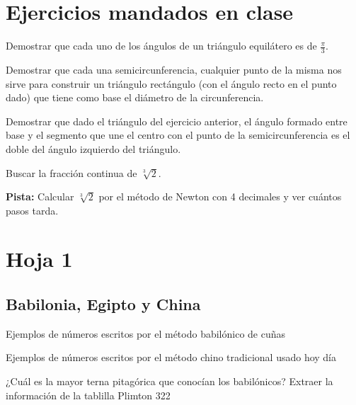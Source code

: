 \section{Ejercicios mandados en clase}
\begin{problem}[1]
Demostrar que cada uno de los ángulos de un triángulo equilátero es de $\frac{π}{3}$.
\solution
\end{problem}

\begin{problem}[2]
Demostrar que cada una semicircunferencia, cualquier punto de la misma nos sirve para construir un triángulo rectángulo (con el ángulo recto en el punto dado) que tiene como base el diámetro de la circunferencia.
\solution
\end{problem}

\begin{problem}[3]
Demostrar que dado el triángulo del ejercicio anterior, el ángulo formado entre base y el segmento que une el centro con el punto de la semicircunferencia es el doble del ángulo izquierdo del triángulo.
\solution
\end{problem}

\begin{problem}[4]
Buscar la fracción continua de $\sqrt[3]{2}$.

\textbf{Pista:} Calcular $\sqrt[3]{2}$ por el método de Newton con 4 decimales y ver cuántos pasos tarda.
\solution
\end{problem}

\section{Hoja 1}
\subsection{Babilonia, Egipto y China}
\begin{problem}[1]
Ejemplos de números escritos por el método babilónico de cuñas

\solution

\end{problem}

\begin{problem}[2]
Ejemplos de números escritos por el método chino tradicional usado hoy día

\solution

\end{problem}

\begin{problem}[3]
¿Cuál es la mayor terna pitagórica que conocían los babilónicos? Extraer la información de la tablilla Plimton 322

\solution

\end{problem}

